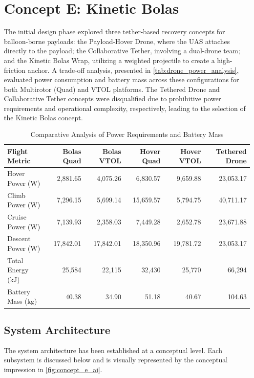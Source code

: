 \section{Concept E: Kinetic Bolas}

The initial design phase explored three tether-based recovery concepts for balloon-borne payloads: the Payload-Hover Drone, where the UAS attaches directly to the payload; the Collaborative Tether, involving a dual-drone team; and the Kinetic Bolas Wrap, utilizing a weighted projectile to create a high-friction anchor. A trade-off analysis, presented in \autoref{tab:drone_power_analysis}, evaluated power consumption and battery mass across these configurations for both Multirotor (Quad) and VTOL platforms. The Tethered Drone and Collaborative Tether concepts were disqualified due to prohibitive power requirements and operational complexity, respectively, leading to the selection of the Kinetic Bolas concept.

\begin{table}[H]
\centering
\caption{Comparative Analysis of Power Requirements and Battery Mass}
\label{tab:drone_power_analysis}
\begin{tabular}{lrrrrr}
\toprule
\textbf{Flight Metric} & \textbf{Bolas Quad} & \textbf{Bolas VTOL} & \textbf{Hover Quad} & \textbf{Hover VTOL} & \textbf{Tethered Drone} \\
\midrule
Hover Power (W)    & 2,881.65  & 4,075.26  & 6,830.57  & 9,659.88  & 23,053.17 \\
Climb Power (W)    & 7,296.15  & 5,699.14  & 15,659.57 & 5,794.75  & 40,711.17 \\
Cruise Power (W)  & 7,139.93  & 2,358.03  & 7,449.28  & 2,652.78  & 23,671.88 \\
Descent Power (W) & 17,842.01 & 17,842.01 & 18,350.96 & 19,781.72 & 23,053.17 \\
\midrule
Total Energy (kJ)  & 25,584    & 22,115    & 32,430    & 25,770    & 66,294    \\
Battery Mass (kg) & 40.38     & 34.90     & 51.18     & 40.67     & 104.63    \\
\bottomrule
\end{tabular}
\end{table}

\subsection{System Architecture}
\label{subsec:concept_A_architecture}
The system architecture has been established at a conceptual level. Each subsystem is discussed below and is visually represented by the conceptual impression in \autoref{fig:concept_e_ai}.

